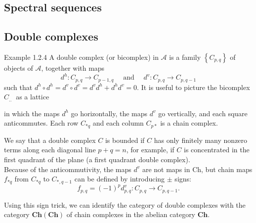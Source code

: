 \begin{example}
\section{Spectral sequences}



\subsection{Double complexes}
Example 1.2.4 A double complex (or bicomplex) in $\mathcal{A}$ is a family $\left\{C_{p, q}\right\}$ of objects of $\mathcal{A}$, together with maps
$$
d^h: C_{p, q} \rightarrow C_{p-1, q} \quad \text { and } \quad d^v: C_{p, q} \rightarrow C_{p, q-1}
$$
such that $d^h \circ d^h=d^v \circ d^v=d^v d^h+d^h d^v=0$. It is useful to picture the bicomplex $C_{\text {.. }}$ as a lattice 
    in which the maps $d^h$ go horizontally, the maps $d^v$ go vertically, and each square anticommutes. Each row $C_{* q}$ and each column $C_{p *}$ is a chain complex.

We say that a double complex $C$ is bounded if $C$ has only finitely many nonzero terms along each diagonal line $p+q=n$, for example, if $C$ is concentrated in the first quadrant of the plane (a first quadrant double complex).\\
Because of the anticommutivity, the maps $d^v$ are not maps in Ch, but chain maps $f_{* q}$ from $C_{* q}$ to $C_{*, q-1}$ can be defined by introducing $\pm$ signs:
$$
f_{p, q}=(-1)^p d_{p, q}^v: C_{p, q} \rightarrow C_{p, q-1} .
$$

Using this sign trick, we can identify the category of double complexes with the category $\mathbf{C h}(\mathbf{C h})$ of chain complexes in the abelian category $\mathbf{C h}$.\\


\end{example}
